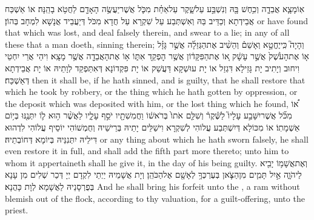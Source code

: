 {אֽוֹ\maqqaf מָצָ֧א אֲבֵדָ֛ה וְכִ֥חֶשׁ בָּ֖הּ וְנִשְׁבַּ֣ע עַל\maqqaf שָׁ֑קֶר עַל\maqqaf אַחַ֗ת מִכֹּ֛ל אֲשֶׁר\maqqaf יַעֲשֶׂ֥ה הָאָדָ֖ם לַחֲטֹ֥א בָהֵֽנָּה׃}
{אוֹ אַשְׁכַּח אֲבֵידְתָא וְכַדֵּיב בַּהּ וְאִשְׁתְּבַע עַל שִׁקְרָא עַל חֲדָא מִכֹּל דְּיַעֲבֵיד אֲנָשָׁא לִמְחָב בְּהוֹן׃}
{or have found that which was lost, and deal falsely therein, and swear to a lie; in any of all these that a man doeth, sinning therein;}{}
{וְהָיָה֮ כִּֽי\maqqaf יֶחֱטָ֣א וְאָשֵׁם֒ וְהֵשִׁ֨יב אֶת\maqqaf הַגְּזֵלָ֜ה אֲשֶׁ֣ר גָּזָ֗ל א֤וֹ אֶת\maqqaf הָעֹ֙שֶׁק֙ אֲשֶׁ֣ר עָשָׁ֔ק א֚וֹ אֶת\maqqaf הַפִּקָּד֔וֹן אֲשֶׁ֥ר הׇפְקַ֖ד אִתּ֑וֹ א֥וֹ אֶת\maqqaf הָאֲבֵדָ֖ה אֲשֶׁ֥ר מָצָֽא׃}
{וִיהֵי אֲרֵי יִחְטֵי וִיחוּב וְיָתִיב יָת גָּזֵילָא דִּגְזַל אוֹ יָת עוּשְׁקָא דַּעֲשַׁק אוֹ יָת פִּקְדוֹנָא דְּאִתַּפְקַד לְוָתֵיהּ אוֹ יָת אֲבֵידְתָא דְּאַשְׁכַּח׃}
{then it shall be, if he hath sinned, and is guilty, that he shall restore that which he took by robbery, or the thing which he hath gotten by oppression, or the deposit which was deposited with him, or the lost thing which he found,}{}
{א֠וֹ מִכֹּ֞ל אֲשֶׁר\maqqaf יִשָּׁבַ֣ע עָלָיו֮ לַשֶּׁ֒קֶר֒ וְשִׁלַּ֤ם אֹתוֹ֙ בְּרֹאשׁ֔וֹ וַחֲמִשִׁתָ֖יו יֹסֵ֣ף עָלָ֑יו לַאֲשֶׁ֨ר ה֥וּא ל֛וֹ יִתְּנֶ֖נּוּ בְּי֥וֹם אַשְׁמָתֽוֹ׃}
{אוֹ מִכּוֹלָא דְּיִשְׁתְּבַע עֲלוֹהִי לְשִׁקְרָא וִישַׁלֵּים יָתֵיהּ בְּרֵישֵׁיהּ וְחֻמְשׁוֹהִי יוֹסֵיף עֲלוֹהִי לִדְהוּא דִּילֵיהּ יִתְּנִנֵּיהּ בְּיוֹמָא דְּחוֹבְתֵיהּ׃}
{or any thing about which he hath sworn falsely, he shall even restore it in full, and shall add the fifth part more thereto; unto him to whom it appertaineth shall he give it, in the day of his being guilty.}{}
{וְאֶת\maqqaf אֲשָׁמ֥וֹ יָבִ֖יא לַיהֹוָ֑ה אַ֣יִל תָּמִ֧ים מִן\maqqaf הַצֹּ֛אן בְּעֶרְכְּךָ֥ לְאָשָׁ֖ם אֶל\maqqaf הַכֹּהֵֽן׃}
{וְיָת אֲשָׁמֵיהּ יַיְתֵי לִקְדָם יְיָ דְּכַר שְׁלִים מִן עָנָא בְּפֻרְסָנֵיהּ לַאֲשָׁמָא לְוָת כָּהֲנָא׃}
{And he shall bring his forfeit unto the \lord, a ram without blemish out of the flock, according to thy valuation, for a guilt-offering, unto the priest.}{}

